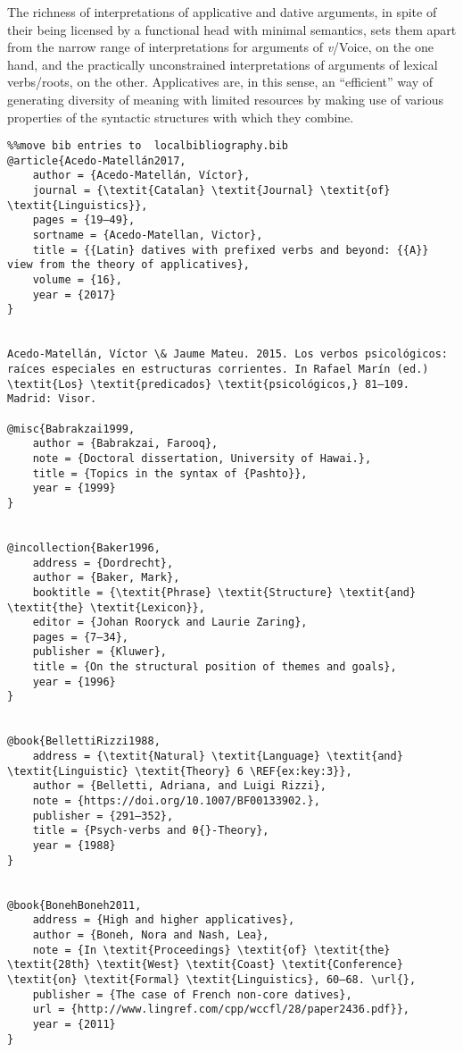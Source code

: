 \documentclass[output=paper,modfonts,nonflat]{langsci/langscibook}
\begin{document}
The richness of interpretations of applicative and dative arguments, in spite of their being licensed by a functional head with minimal semantics, sets them apart from the narrow range of interpretations for arguments of \textit{v}/Voice, on the one hand, and the practically unconstrained interpretations of arguments of lexical verbs/roots, on the other. Applicatives are, in this sense, an “efficient” way of generating diversity of meaning with limited resources by making use of various properties of the syntactic structures with which they combine.
\begin{verbatim}%%move bib entries to  localbibliography.bib
@article{Acedo-Matellán2017,
	author = {Acedo-Matellán, Víctor},
	journal = {\textit{Catalan} \textit{Journal} \textit{of} \textit{Linguistics}},
	pages = {19–49},
	sortname = {Acedo-Matellan, Victor},
	title = {{Latin} datives with prefixed verbs and beyond: {{A}} view from the theory of applicatives},
	volume = {16},
	year = {2017}
}


Acedo-Matellán, Víctor \& Jaume Mateu. 2015. Los verbos psicológicos: raíces especiales en estructuras corrientes. In Rafael Marín (ed.) \textit{Los} \textit{predicados} \textit{psicológicos,} 81–109. Madrid: Visor.

@misc{Babrakzai1999,
	author = {Babrakzai, Farooq},
	note = {Doctoral dissertation, University of Hawai.},
	title = {Topics in the syntax of {Pashto}},
	year = {1999}
}


@incollection{Baker1996,
	address = {Dordrecht},
	author = {Baker, Mark},
	booktitle = {\textit{Phrase} \textit{Structure} \textit{and} \textit{the} \textit{Lexicon}},
	editor = {Johan Rooryck and Laurie Zaring},
	pages = {7–34},
	publisher = {Kluwer},
	title = {On the structural position of themes and goals},
	year = {1996}
}


@book{BellettiRizzi1988,
	address = {\textit{Natural} \textit{Language} \textit{and} \textit{Linguistic} \textit{Theory} 6 \REF{ex:key:3}},
	author = {Belletti, Adriana, and Luigi Rizzi},
	note = {https://doi.org/10.1007/BF00133902.},
	publisher = {291–352},
	title = {Psych-verbs and θ{}-Theory},
	year = {1988}
}


@book{BonehBoneh2011,
	address = {High and higher applicatives},
	author = {Boneh, Nora and Nash, Lea},
	note = {In \textit{Proceedings} \textit{of} \textit{the} \textit{28th} \textit{West} \textit{Coast} \textit{Conference} \textit{on} \textit{Formal} \textit{Linguistics}, 60–68. \url{},
	publisher = {The case of French non-core datives},
	url = {http://www.lingref.com/cpp/wccfl/28/paper2436.pdf}},
	year = {2011}
}



\end{verbatim}
\end{document}
